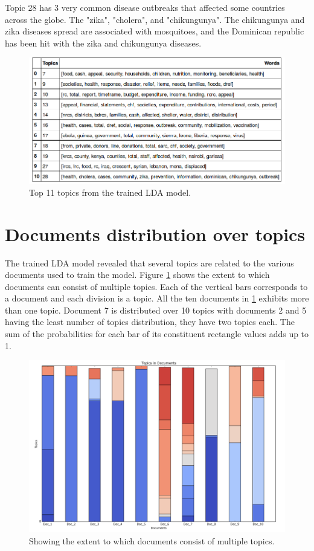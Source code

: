 \begin{flushleft}
Topic 28 has 3 very common disease outbreaks that affected some countries across the globe. The "zika", "cholera", and "chikungunya". The chikungunya and zika diseases spread are associated with mosquitoes, and the Dominican republic has been hit with the zika and chikungunya diseases. 
\end{flushleft}
\begin{figure}[hb]
\centering
\includegraphics[scale=0.6]{c4_2.png}
\caption{Top 11 topics from the trained LDA model.}
\end{figure}\label{Table 4.1}
\section{Documents distribution over topics}
The trained LDA model revealed that several topics are related to the various documents used to train the model. Figure \ref{Figure 4.2} shows the extent to which documents can consist of multiple topics. Each of the vertical bars corresponds to a document and each division is a topic. All the ten documents in \ref{Figure 4.2} exhibits more than one topic. Document 7 is distributed over 10 topics with documents 2 and 5 having the least number of topics distribution,  they have two topics each. The sum of the probabilities for each bar of its constituent rectangle values adds up to 1.
\begin{figure}[h]
\centering
\includegraphics[scale=0.25]{c4_3_orig.png}
\caption{Showing the extent to which documents consist of multiple topics.}\label{Figure 4.2}
\end{figure}
